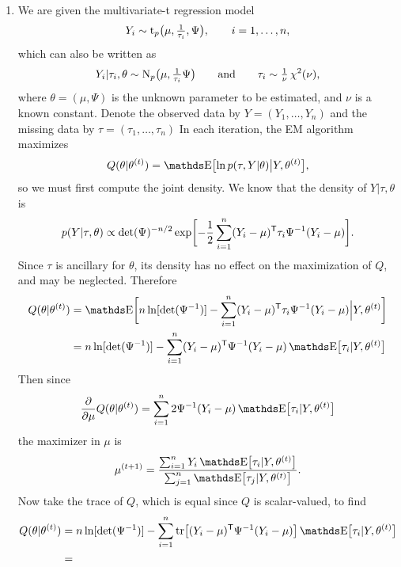 \begin{enumerate}
\item %
We are given the multivariate-t regression model
    \[
    Y_i \sim \operatorname{t}_p \bigl( \mu, \tfrac{1}{\tau_i}, \Psi \bigr),
    \qquad
    i = 1, \ldots, n,
    \]
which can also be written as
    \[
    Y_i \vert \tau_i, \theta 
    \sim
    \operatorname{N}_p \bigl( \mu, \tfrac{1}{\tau_i}\Psi \bigr)
    \qquad\text{and}\qquad
    \tau_i
    \sim
    \tfrac{1}{\nu} \operatorname{\chi^2}(\nu),
    \]
where $\theta = (\mu, \Psi)$ is the unknown parameter to be estimated,
and $\nu$ is a known constant.
Denote the observed data by $Y = (Y_1, \ldots, Y_n)$
and the missing data by $\tau = (\tau_1, \ldots, \tau_n)$
In each iteration, the EM algorithm maximizes
    \[
    Q(\theta \vert \theta^{(t)})
    =
    \E \bigl[ \ln p(\tau, Y \vert \theta) \big\vert Y, \theta^{(t)} \bigr],
    \]
so we must first compute the joint density.
We know that the density of $Y \vert \tau, \theta$ is
    \[
    p(Y \vert \tau, \theta)
    \propto
    \det(\Psi)^{-n/2} 
    \exp \biggl[
    -\frac{1}{2}\sum_{i=1}^n (Y_i - \mu)^\mathsf{T} \tau_i \Psi^{-1} (Y_i - \mu) 
    \biggr].
    \]
Since $\tau$ is ancillary for $\theta$, its density has no effect on the
maximization of $Q$, and may be neglected.
Therefore
    \begin{align*}
    Q(\theta \vert \theta^{(t)})
    &=
    \E \biggl[
    n\ln [ \det(\Psi^{-1}) ]
    - \sum_{i=1}^n (Y_i - \mu)\T \tau_i \Psi^{-1} (Y_i - \mu)
    \Big\vert Y, \theta^{(t)}
    \biggr]
    \\ &=
    n\ln [ \det(\Psi^{-1}) ]
    - \sum_{i=1}^n (Y_i - \mu)\T \Psi^{-1} (Y_i - \mu)
    \E \bigl[ \tau_i \vert Y, \theta^{(t)} \bigr]
    \end{align*}
Then since
    \[
    \pd{\mu} Q(\theta \vert \theta^{(t)})
    =
    \sum_{i=1}^n 2\Psi^{-1} (Y_i - \mu)
    \E \bigl[ \tau_i \vert Y, \theta^{(t)} \bigr]
    \]
the maximizer in $\mu$ is
    \begin{equation}
    \label{eqn:mu}
    \mu^{(t+1)}
    =
    \frac {\sum_{i=1}^n Y_i \E \bigl[ \tau_i \vert Y, \theta^{(t)} \bigr]} 
    {\sum_{j=1}^n \E \bigl[ \tau_j \vert Y, \theta^{(t)} \bigr]}.
    \end{equation}
Now take the trace of $Q$, which is equal since $Q$ is scalar-valued,
to find
    \begin{align*}
    Q(\theta \vert \theta^{(t)})
    &=
    n\ln [ \det(\Psi^{-1}) ]
    - \sum_{i=1}^n \tr \bigl[
    (Y_i - \mu)\T \Psi^{-1} (Y_i - \mu)
    \bigr]
    \E \bigl[ \tau_i \vert Y, \theta^{(t)} \bigr]
    \\ &=

\end{align*}
\end{enumerate}
